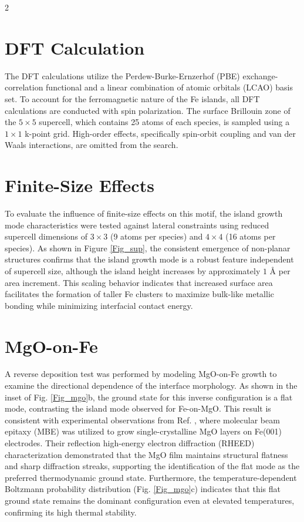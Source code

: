 \documentclass[12pt]{spieman}  %
\begin{document}
\begin{spacing}{2}
\section{DFT Calculation}

The DFT calculations utilize the Perdew-Burke-Ernzerhof (PBE) exchange-correlation functional \cite{Perdew1996} and a linear combination of atomic orbitals (LCAO) basis set. To account for the ferromagnetic nature of the Fe islands, all DFT calculations are conducted with spin polarization. The surface Brillouin zone of the $5\times5$ supercell, which contains 25 atoms of each species, is sampled using a $1\times1$ k-point grid. High-order effects, specifically spin-orbit coupling and van der Waals interactions, are omitted from the search.

\section{Finite-Size Effects}

To evaluate the influence of finite-size effects on this motif, the island growth mode characteristics were tested against lateral constraints using reduced supercell dimensions of $3\times3$ (9 atoms per species) and $4\times4$ (16 atoms per species). As shown in Figure \ref{Fig_sup}, the consistent emergence of non-planar structures confirms that the island growth mode is a robust feature independent of supercell size, although the island height increases by approximately $1\text{ \AA}$ per area increment. This scaling behavior indicates that increased surface area facilitates the formation of taller Fe clusters to maximize bulk-like metallic bonding while minimizing interfacial contact energy.

\section{MgO-on-Fe}

A reverse deposition test was performed by modeling MgO-on-Fe growth to examine the directional dependence of the interface morphology. As shown in the inset of Fig. \ref{Fig_mgo}b, the ground state for this inverse configuration is a flat mode, contrasting the island mode observed for Fe-on-MgO. This result is consistent with experimental observations from Ref. \cite{ernult2003}, where molecular beam epitaxy (MBE) was utilized to grow single-crystalline MgO layers on Fe(001) electrodes. Their reflection high-energy electron diffraction (RHEED) characterization demonstrated that the MgO film maintains structural flatness and sharp diffraction streaks, supporting the identification of the flat mode as the preferred thermodynamic ground state. Furthermore, the temperature-dependent Boltzmann probability distribution (Fig. \ref{Fig_mgo}c) indicates that this flat ground state remains the dominant configuration even at elevated temperatures, confirming its high thermal stability.


\end{spacing}
\end{document}
